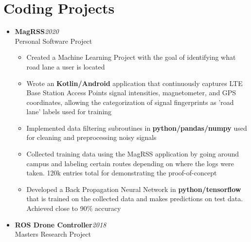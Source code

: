 \section{\sectionheading Coding Projects}

\begin{itemize}[leftmargin=0pt, label={}]%

\item{
{\sectionheading\large{\textbf{MagRSS}}}\hfill {\sectionheading\small{\textit{2020}}}\\
{\sectionheading\small{Personal Software Project}}\hfill

    \vspace{-6pt}
    \begin{itemize}[label=\textbullet, leftmargin=*, noitemsep]%
        \item{Created a Machine Learning Project with the goal of identifying what road lane a user is located}
        \item{Wrote an \textbf{Kotlin/Android} application that continuously captures LTE Base Station Access Points signal intensities, magnetometer, and GPS coordinates, allowing the categorization of signal fingerprints as 'road lane' labels used for training}
        \item{Implemented data filtering subroutines in \textbf{python/pandas/numpy} used for cleaning and preprocessing noisy signals}
        \item{Collected training data using the MagRSS application by going around campus and labeling certain routes depending on where the logs were taken. 120k entries total for demonstrating the proof-of-concept}
        \item{Developed a Back Propagation Neural Network in \textbf{python/tensorflow} that is trained on the collected data and makes predictions on test data. Achieved close to 90\% accuracy}
    \end{itemize}
}

\item{
{\sectionheading\large{\textbf{ROS Drone Controller}}}\hfill {\sectionheading\small{\textit{2018}}}\\
{\sectionheading\small{Masters Research Project}}\hfill

}
\end{itemize}
